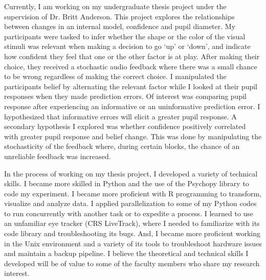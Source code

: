 \documentclass[12pt]{article}
\begin{document}
	Currently, I am working on my undergraduate thesis project under the supervision of Dr. Britt Anderson. This project explores the relationships between changes in an internal model, confidence and pupil diameter. My participants were tasked to infer whether the shape or the color of the visual stimuli was relevant when making a decision to go `up' or `down', and indicate how confident they feel that one or the other factor is at play. After making their choice, they received a stochastic audio feedback where there was a small chance to be wrong regardless of making the correct choice. I manipulated the participants belief by alternating the relevant factor while I looked at their pupil responses when they made prediction errors. Of interest was comparing pupil response after experiencing an informative or an uninformative prediction error. I hypothesized that informative errors will elicit a greater pupil response. A secondary hypothesis I explored was whether confidence positively correlated with greater pupil response and belief change. This was done by manipulating the stochasticity of the feedback where, during certain blocks, the chance of an unreliable feedback was increased.
	
	In the process of working on my thesis project, I developed a variety of technical skills. I became more skilled in Python and the use of the Psychopy library to code my experiment. I became more proficient with R programming to transform, visualize and analyze data. I applied parallelization to some of my Python codes to run concurrently with another task or to expedite a process. I learned to use an unfamiliar eye tracker (CRS LiveTrack), where I needed to familiarize with its code library and troubleshooting its bugs. And, I became more proficient working in the Unix environment and a variety of its tools to troubleshoot hardware issues and maintain a backup pipeline. I believe the theoretical and technical skills I developed will be of value to some of the faculty members who share my research interest.
	
\end{document}
